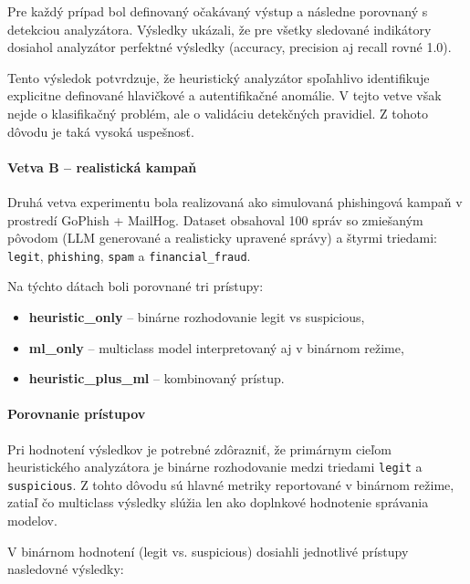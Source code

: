 \documentclass[conference]{IEEEtran}
\begin{document}
Pre každý prípad bol definovaný očakávaný výstup a následne porovnaný s detekciou analyzátora. Výsledky ukázali, že pre všetky sledované indikátory dosiahol analyzátor perfektné výsledky (accuracy, precision aj recall rovné 1.0).

Tento výsledok potvrdzuje, že heuristický analyzátor spoľahlivo identifikuje explicitne definované hlavičkové a autentifikačné anomálie. V tejto vetve však nejde o klasifikačný problém, ale o validáciu detekčných pravidiel. Z tohoto dôvodu je taká vysoká uspešnosť.

\paragraph{Vetva B – realistická kampaň}

Druhá vetva experimentu bola realizovaná ako simulovaná phishingová kampaň v prostredí GoPhish + MailHog. Dataset obsahoval 100 správ so zmiešaným pôvodom (LLM generované a realisticky upravené správy) a štyrmi triedami: \texttt{legit}, \texttt{phishing}, \texttt{spam} a \texttt{financial\_fraud}.

Na týchto dátach boli porovnané tri prístupy:

\begin{itemize}
    \item \textbf{heuristic\_only} – binárne rozhodovanie legit vs suspicious,
    \item \textbf{ml\_only} – multiclass model interpretovaný aj v binárnom režime,
    \item \textbf{heuristic\_plus\_ml} – kombinovaný prístup.
\end{itemize}

\paragraph{Porovnanie prístupov}

Pri hodnotení výsledkov je potrebné zdôrazniť, že primárnym cieľom heuristického analyzátora je binárne rozhodovanie medzi triedami \texttt{legit} a \texttt{suspicious}. Z tohto dôvodu sú hlavné metriky reportované v binárnom režime, zatiaľ čo multiclass výsledky slúžia len ako doplnkové hodnotenie správania modelov.

V binárnom hodnotení (legit vs. suspicious) dosiahli jednotlivé prístupy nasledovné výsledky:
\end{document}
